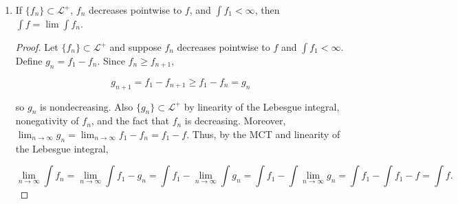 \documentclass[11pt,oneside,english]{amsart}
\theoremstyle{definition}
\newcommand{\lom}[2]{\lim_{{#1}\rightarrow{#2}}}
\newcommand{\MC}[1]{\mathcal{#1}}
\begin{document}
\begin{enumerate}
\begin{proof}
\begin{align*}
\int fg\,d\mu&=\int f\cdot\sum_{j=1}^n a_j\chi_{E_j}\,d\mu\\[2mm]
&=\int\sum_{j=1}^nf\cdot a_j\chi_{E_j}\,d\mu\\[2mm]
&=\sum_{j=1}^n\int f\cdot a_j\chi_{E_j}\,d\mu\\[2mm]
&=\sum_{j=1}^na_j\int_{E_j} f\,d\mu\\[2mm]
&=\sum_{j=1}^na_j\lambda(E_j)\\[2mm]
&=\int g\,d\lambda.
\end{align*}

Now release the requirement that $g$ be simple and simply let $g\in\MC{L}^+$. By Propositon 2.10, there exists a sequence of nondecreasing simple functions $\{\phi_n\}\subset\MC{L}^+$ such that $\phi_n\rightarrow g$ pointwise. Consequently, $f\phi_n\rightarrow fg$ pointwise and by the result for simple functions and the MCT we have

\begin{align*}
\int fg\,d\mu&=\int f\left(\lom{n}{\infty}\phi_n\right)\,d\mu\\[2mm]
&=\int\lom{n}{\infty}f\phi_n\,d\mu\\[2mm]
&\stackrel{\text{MCT}}{=}\lom{n}{\infty}\int f\phi_n\,d\mu\\[2mm]
&=\lom{n}{\infty}\int\phi_n\,d\lambda\\[2mm]
&\stackrel{\text{MCT}}{=}\int\lom{n}{\infty}\phi_n\,d\lambda\\[2mm]
&=\int g\,d\lambda.
\end{align*}
\end{proof}

\item If $\{f_n\}\subset\MC{L}^+$, $f_n$ decreases pointwise to $f$, and $\int f_1<\infty$, then $\int f=\lim\int f_n$.

\begin{proof}
Let $\{f_n\}\subset\MC{L}^+$ and suppose $f_n$ decreases pointwise to $f$ and $\int f_1<\infty$. Define $g_n=f_1-f_n$. Since $f_n\geq f_{n+1}$, 

\[
g_{n+1}=f_1-f_{n+1}\geq f_1-f_n=g_n
\]

so $g_n$ is nondecreasing. Also $\{g_n\}\subset\MC{L}^+$ by linearity of the Lebesgue integral, nonegativity of $f_n$, and the fact that $f_n$ is decreasing. Moreover, $\lom{n}{\infty}g_n=\lom{n}{\infty}f_1-f_n=f_1-f$. Thus, by the MCT and linearity of the Lebesgue integral,

\[
\lom{n}{\infty}\int f_n=\lom{n}{\infty}\int f_1-g_n=\int f_1-\lom{n}{\infty}\int g_n=\int f_1-\int \lom{n}{\infty} g_n=\int f_1-\int f_1-f=\int f.
\]
\end{proof}



\end{enumerate}
\end{document}
